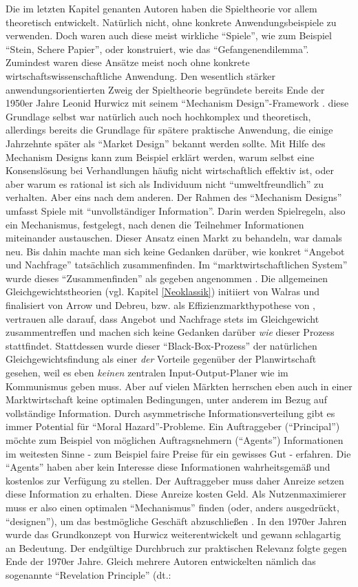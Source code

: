 Die im letzten Kapitel genanten Autoren haben die Spieltheorie vor allem theoretisch entwickelt. Natürlich nicht, ohne konkrete Anwendungsbeispiele zu verwenden. Doch waren auch diese meist wirkliche "`Spiele"', wie zum Beispiel "`Stein, Schere Papier"', oder konstruiert, wie das "`Gefangenendilemma"'. Zumindest waren diese Ansätze meist noch ohne konkrete wirtschaftswissenschaftliche Anwendung. Den wesentlich stärker anwendungsorientierten Zweig der Spieltheorie begründete bereits Ende der 1950er Jahre Leonid Hurwicz mit seinem "`Mechanism Design"'-Framework \parencite{Arrow1960}. diese Grundlage selbst war natürlich auch noch hochkomplex und theoretisch, allerdings bereits die Grundlage für spätere praktische Anwendung, die einige Jahrzehnte später als "`Market Design"' bekannt werden sollte. Mit Hilfe des Mechanism Designs kann zum Beispiel erklärt werden, warum selbst eine Konsenslösung bei Verhandlungen häufig nicht wirtschaftlich effektiv ist, oder aber warum es rational ist sich als Individuum nicht "`umweltfreundlich"' zu verhalten. Aber eins nach dem anderen. Der Rahmen des "`Mechanism Designs"' umfasst Spiele mit "`unvollständiger Information"'. Darin werden Spielregeln, also ein Mechanismus, festgelegt, nach denen die Teilnehmer Informationen miteinander austauschen. Dieser Ansatz einen Markt zu behandeln, war damals neu. Bis dahin machte man sich keine Gedanken darüber, wie konkret "`Angebot und Nachfrage"' tatsächlich zusammenfinden. Im "`marktwirtschaftlichen System"' wurde dieses "`Zusammenfinden"' als gegeben angenommen \parencite[S. 1]{Hurwicz1973}. Die allgemeinen Gleichgewichtstheorien (vgl. Kapitel \ref{Neoklassik}) initiiert von Walras und finalisiert von Arrow und Debreu, bzw. als Effizienzmarkthypothese von \textcite{Fama1970}, vertrauen alle darauf, dass Angebot und Nachfrage stets im Gleichgewicht zusammentreffen und machen sich keine Gedanken darüber \textit{wie} dieser Prozess stattfindet. Stattdessen wurde dieser "`Black-Box-Prozess"' der natürlichen Gleichgewichtsfindung als einer \textit{der} Vorteile gegenüber der Planwirtschaft gesehen, weil es eben \textit{keinen} zentralen Input-Output-Planer wie im Kommunismus geben muss. Aber auf vielen Märkten herrschen eben auch in einer  Marktwirtschaft keine optimalen Bedingungen, unter anderem im Bezug auf vollständige Information. Durch asymmetrische Informationsverteilung gibt es immer Potential für "`Moral Hazard"'-Probleme. Ein Auftraggeber ("`Principal"') möchte zum Beispiel von möglichen Auftragsnehmern ("`Agents"') Informationen im weitesten Sinne - zum Beispiel faire Preise für ein gewisses Gut - erfahren. Die "`Agents"' haben aber kein Interesse diese Informationen wahrheitsgemäß und kostenlos zur Verfügung zu stellen. Der Auftraggeber muss daher Anreize setzen diese Information zu erhalten. Diese Anreize kosten Geld. Als Nutzenmaximierer muss er also einen optimalen "`Mechanismus"' finden (oder, anders ausgedrückt, "`designen"'), um das bestmögliche Geschäft abzuschließen \parencite[S. 243]{Fudenberg1991}. In den 1970er Jahren wurde das Grundkonzept von Hurwicz weiterentwickelt und gewann schlagartig an Bedeutung. Der endgültige Durchbruch zur praktischen Relevanz folgte gegen Ende der 1970er Jahre. Gleich mehrere Autoren entwickelten nämlich das sogenannte "`Revelation Principle"' (dt.: 